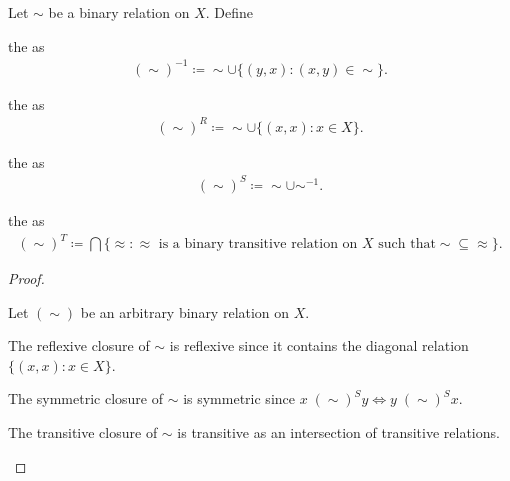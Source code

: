\begin{definition}\label{def:derived_relations}
  Let $\sim$ be a binary relation on $X$. Define
  \begin{defenum}
    \item\label{def:derived_relations/converse} the  as
    \begin{align*}
      (\sim)^{-1} \coloneqq \sim \cup \{ (y, x) \colon (x, y) \in \sim \}.
    \end{align*}

    \item\label{def:derived_relations/reflexive} the  as
    \begin{align*}
      (\sim)^R \coloneqq \sim \cup \{ (x, x) \colon x \in X \}.
    \end{align*}

    \item\label{def:derived_relations/symmetric} the  as
    \begin{align*}
      (\sim)^S \coloneqq \sim \cup \sim^{-1}.
    \end{align*}

    \item\label{def:derived_relations/transitive} the  as
    \begin{align*}
      (\sim)^T \coloneqq \bigcap \{ \approx \colon \approx \text{ is a binary transitive relation on $X$ such that} \sim \subseteq \approx \}.
    \end{align*}
  \end{defenum}
\end{definition}
\begin{proof}
\begin{itemize}
  Let $(\sim)$ be an arbitrary binary relation on $X$.

  \begin{description}
     The reflexive closure of $\sim$ is reflexive since it contains the diagonal relation $\{ (x, x) \colon x \in X \}$.

     The symmetric closure of $\sim$ is symmetric since $x \;(\sim)^S y \iff y \;(\sim)^S x$.

     The transitive closure of $\sim$ is transitive as an intersection of transitive relations.
  \end{description}
\end{itemize}
\end{proof}
